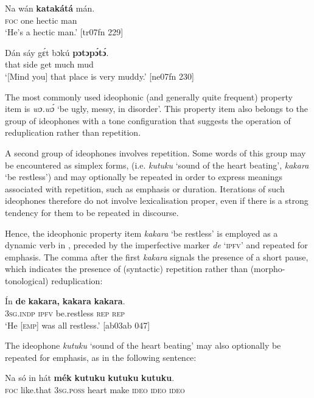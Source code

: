 \ea%
    \label{ex:key:1616}
    \gll Na  wán    \textbf{katakátá}  mán.\\
\textsc{foc}  one    hectic    man\\

\glt ‘He’s a hectic man.’ [tr07fn 229]
\z


\ea%
    \label{ex:key:1617}
    \gll Dán  sáy  gɛ́t  bɔkú  \textbf{pɔtɔpɔ́tɔ́}.\\
that  side  get  much  mud  \\

\glt ‘[Mind you] that place is very muddy.’ [ne07fn 230]
\z

The most commonly used ideophonic (and generally quite frequent) property item is \textit{wɔ.wɔ́} ‘be ugly, messy, in disorder’. This property item also belongs to the group of ideophones with a tone configuration that suggests the operation of reduplication rather than repetition. 

A second group of ideophones involves repetition. Some words of this group may be encountered as simplex forms, (i.e. \textit{kutuku} ‘sound of the heart beating’, \textit{kakara} ‘be restless’) and may optionally be repeated in order to express meanings associated with repetition, such as emphasis or duration. Iterations of such ideophones therefore do not involve lexicalisation proper, even if there is a strong tendency for them to be repeated in discourse. 


Hence, the ideophonic property item \textit{kakara} ‘be restless’ is employed as a dynamic verb in , preceded by the imperfective marker \textit{de} ‘\textsc{ipfv}’ and repeated for emphasis. The comma after the first \textit{kakara} signals the presence of a short pause, which indicates the presence of (syntactic) repetition rather than (morpho-tonological) reduplication: 



\ea%
    \label{ex:key:1618}
    \gll \'{I}n    \textbf{de}  \textbf{kakara,}    \textbf{kakara}  \textbf{kakara}.\\
\textsc{3sg.indp}  \textsc{ipfv}  be.restless  \textsc{rep}    \textsc{rep}\\

\glt ‘He [\textsc{emp}] was all restless.’ [ab03ab 047]
\z

The ideophone \textit{kutuku} ‘sound of the heart beating’ may also optionally be repeated for emphasis, as in the following sentence: 


\ea%
    \label{ex:key:1619}
    \gll Na  só    in    hát    \textbf{mék}    \textbf{kutuku}  \textbf{kutuku}  \textbf{kutuku}.\\
\textsc{foc}  like.that  \textsc{3sg.poss}  heart  make  \textsc{ideo}    \textsc{ideo}    \textsc{ideo}\\

